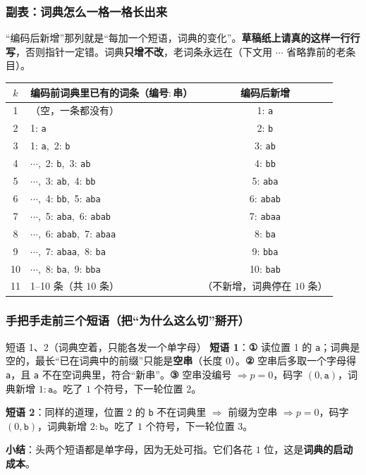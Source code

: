 \documentclass[11pt,a4paper]{ctexart}
\begin{document}
\subsubsection{副表：词典怎么一格一格长出来}

“编码后新增”那列就是“每加一个短语，词典的变化”。\textbf{草稿纸上请真的这样一行行写}，否则指针一定错。词典\textbf{只增不改}，老词条永远在（下文用 $\cdots$ 省略靠前的老条目）。

\begingroup
\small
\setlength{\tabcolsep}{4pt}
\begin{tabular}{@{}c p{10.4cm} c@{}}
\toprule
$k$ & 编码\textbf{前}词典里已有的词条（编号$:$串） & 编码\textbf{后}新增 \\
\midrule
1 & （空，一条都没有） & 1$:$\,\texttt a \\
2 & 1$:$\,\texttt a & 2$:$\,\texttt b \\
3 & 1$:$\,\texttt a,\ 2$:$\,\texttt b & 3$:$\,\texttt{ab} \\
4 & $\cdots$,\ 2$:$\,\texttt b,\ 3$:$\,\texttt{ab} & 4$:$\,\texttt{bb} \\
5 & $\cdots$,\ 3$:$\,\texttt{ab},\ 4$:$\,\texttt{bb} & 5$:$\,\texttt{aba} \\
6 & $\cdots$,\ 4$:$\,\texttt{bb},\ 5$:$\,\texttt{aba} & 6$:$\,\texttt{abab} \\
7 & $\cdots$,\ 5$:$\,\texttt{aba},\ 6$:$\,\texttt{abab} & 7$:$\,\texttt{abaa} \\
8 & $\cdots$,\ 6$:$\,\texttt{abab},\ 7$:$\,\texttt{abaa} & 8$:$\,\texttt{ba} \\
9 & $\cdots$,\ 7$:$\,\texttt{abaa},\ 8$:$\,\texttt{ba} & 9$:$\,\texttt{bba} \\
10 & $\cdots$,\ 8$:$\,\texttt{ba},\ 9$:$\,\texttt{bba} & 10$:$\,\texttt{bab} \\
11 & 1--10 条（共 $10$ 条） & （不新增，词典停在 $10$ 条） \\
\bottomrule
\end{tabular}
\endgroup

\subsubsection{手把手走前三个短语（把“为什么这么切”掰开）}

\begin{calc}{短语 1、2（词典空着，只能各发一个单字母）}
\textbf{短语 1}：\textbf{①} 读位置 1 的 \texttt a；词典是空的，最长“已在词典中的前缀”只能是\textbf{空串}（长度 $0$）。\textbf{②} 空串后多取一个字母得 \texttt a，且 \texttt a 不在空词典里，符合“新串”。\textbf{③} 空串没编号 $\Rightarrow p=0$，码字 $(0,\texttt a)$，词典新增 $1{:}\texttt a$。吃了 $1$ 个符号，下一轮位置 2。

\textbf{短语 2}：同样的道理，位置 2 的 \texttt b 不在词典里 $\Rightarrow$ 前缀为空串 $\Rightarrow p=0$，码字 $(0,\texttt b)$，词典新增 $2{:}\texttt b$。吃了 $1$ 个符号，下一轮位置 3。

\textbf{小结}：头两个短语都是单字母，因为无处可指。它们各花 $1$ 位，这是\textbf{词典的启动成本}。
\end{calc}
\end{document}

